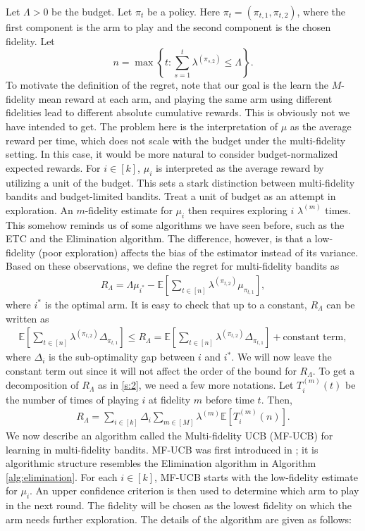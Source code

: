 \documentclass[letterpaper,11pt,openright,openany]{book}
\numberwithin{equation}{section}
\theoremstyle{plain}
\theoremstyle{definition}
\def\E{{\mathbb E}}
\begin{document}
Let $\Lambda>0$ be the budget. Let $\pi_t$ be a policy. Here $\pi_t=(\pi_{t,1}, \pi_{t,2})$, where the first component is the arm to play and the second component is the chosen fidelity. 
Let $$n=\max\left\{t:\sum_{s=1}^t\lambda^{(\pi_{s, 2})}\leq\Lambda\right\}.$$ To motivate the definition of the regret, note that our goal is the learn the $M$-fidelity mean reward at each arm, and playing the same arm using different fidelities lead to different absolute cumulative rewards.
This is obviously not we have intended to get.  
The problem here is the interpretation of $\mu$ as the average reward per time, which does not scale with the budget under the multi-fidelity setting. 
In this case, it would be more natural to consider budget-normalized expected rewards. 
For $i\in [k]$, $\mu_i$ is interpreted as the average reward by utilizing a unit of the budget. 
This sets a stark distinction between multi-fidelity bandits and budget-limited bandits. 
Treat a unit of budget as an attempt in exploration. 
An $m$-fidelity estimate for $\mu_i$ then requires exploring $i$ $\lambda^{(m)}$ times.  
This somehow reminds us of some algorithms we have seen before, such as the ETC and the Elimination algorithm. 
The difference, however, is that a low-fidelity (poor exploration) affects the bias of the estimator instead of its variance. 
Based on these observations, we define the regret for multi-fidelity bandits as 
\begin{align*}
R_\Lambda=\Lambda\mu_{i^*}-\E\left[\sum_{t\in [n]}\lambda^{(\pi_{t,2})}\mu_{\pi_{t,1}}\right],
\end{align*}
where $i^*$ is the optimal arm. It is easy to check that up to a constant, $R_\Lambda$ can be written as 
\begin{align*}
 \E\left[\sum_{t\in [n]}\lambda^{(\pi_{t,2})}\Delta_{\pi_{t,1}}\right]\leq R_\Lambda = \E\left[\sum_{t\in [n]}\lambda^{(\pi_{t,2})}\Delta_{\pi_{t,1}}\right] + \text{constant term},
\end{align*}
where $\Delta_i$ is the sub-optimality gap between $i$ and $i^*$. We will now leave the constant term out since it will not affect the order of the bound for $R_\Lambda$. To get a decomposition of $R_\Lambda$ as in \eqref{s:2}, we need a few more notations. Let $T_{i}^{(m)}(t)$ be the number of times of playing $i$ at fidelity $m$ before time $t$.  Then, 
\begin{align*}
R_\Lambda = \sum_{i\in [k]}\Delta_i\sum_{m\in [M]}\lambda^{(m)}\E\left[T_{i}^{(m)}(n)\right]. 
\end{align*}
We now describe an algorithm called the Multi-fidelity UCB (MF-UCB) for learning in multi-fidelity bandits. 
MF-UCB was first introduced in \cite{kandasamy2016multi}; it is algorithmic structure resembles the Elimination algorithm in Algorithm \ref{alg:elimination}. 
For each $i\in [k]$, MF-UCB starts with the low-fidelity estimate for $\mu_i$. An upper confidence criterion is then used to determine which arm to play in the next round. The fidelity will be chosen as the lowest fidelity on which the arm needs further exploration. The details of the algorithm are given as follows:
\end{document}
